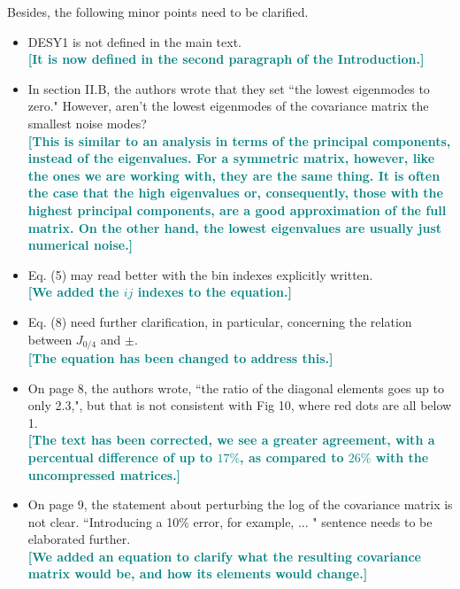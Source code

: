 \documentclass{article}
\newcommand\reply[1]{{\bf {\textcolor{teal}{[#1]}}}}
\begin{document}
	Besides, the following minor points need to be clarified.
	\begin{itemize}
	\item DESY1 is not defined in the main text.  \\
		\reply{It is now defined in the second paragraph of the Introduction.}
	
	\item In section II.B, the authors wrote that they set ``the lowest eigenmodes to zero." However, aren't the lowest eigenmodes of the covariance matrix the smallest noise modes?  \\
		\reply{This is similar to an analysis in terms of the principal components, instead of the eigenvalues. For a symmetric matrix, however, like the ones we are working with, they are the same thing. It is often the case that the high eigenvalues or, consequently, those with the highest principal components, are a good approximation of the full matrix. On the other hand, the lowest eigenvalues are usually just numerical noise.}
	
	\item Eq. (5) may read better with the bin indexes explicitly written. \\
		\reply{We added the $ij$ indexes to the equation.}
	
	\item Eq. (8) need further clarification, in particular, concerning the relation between $J_{0/4}$ and $\pm$. \\
		\reply{The equation has been changed to address this.}
	
	\item On page 8, the authors wrote, ``the ratio of the diagonal elements goes up to only 2.3,", but that is not consistent with Fig 10, where red dots are all below 1. \\
		\reply{The text has been corrected, we see a greater agreement, with a percentual difference of up to $17\%$, as compared to $26\%$ with the uncompressed matrices.}
	
	\item On page 9, the statement about perturbing the log of the covariance matrix is not clear. ``Introducing a 10\% error, for example, ... " sentence needs to be elaborated further. \\
	\reply{We added an equation to clarify what the resulting covariance matrix would be, and how its elements would change.}
\end{itemize}
	
\end{document}
